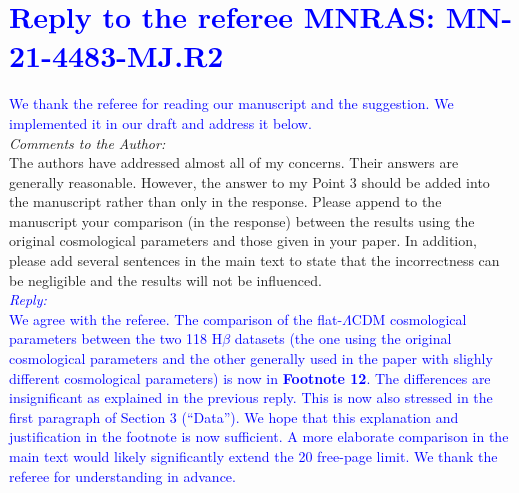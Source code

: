\documentclass[12pt]{article}
\begin{document}


\section*{\textcolor{blue}{Reply to the referee MNRAS: MN-21-4483-MJ.R2}}

\textcolor{blue}{We thank the referee for reading our manuscript and the suggestion. We implemented it in our draft and address it below.}\\

\textit{Comments to the Author:}\\
The authors have addressed almost all of my concerns. Their answers are generally reasonable. However, the answer to my Point 3 should be added into the manuscript rather than only in the response. Please append to the manuscript your comparison (in the response) between the results using the original cosmological parameters and those given in your paper. In addition, please add several sentences in the main text to state that the incorrectness can be negligible and the results will not be influenced.\\

\textcolor{blue}{\textit{Reply:}}\\
\textcolor{blue}{We agree with the referee. The comparison of the flat-$\Lambda$CDM cosmological parameters between the two 118 H$\beta$ datasets (the one using the original cosmological parameters and the other generally used in the paper with slighly different cosmological parameters) is now in \textbf{Footnote 12}. The differences are insignificant as explained in the previous reply. This is now also stressed in the first paragraph of Section 3 (``Data''). We hope that this explanation and justification in the footnote is now sufficient. A more elaborate comparison in the main text would likely significantly extend the 20 free-page limit. We thank the referee for understanding in advance.}
\end{document}
